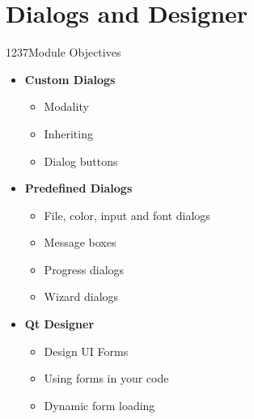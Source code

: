 %
%
%
%

\section{Dialogs and Designer}

\begin{slide}{1237}{Module Objectives}
  \label{widgets}
  
  \begin{itemize}
  \item \textbf{Custom Dialogs}
    \begin{itemize}
    \item Modality
    \item Inheriting 
    \item Dialog buttons
  \end{itemize}
  \item \textbf{Predefined Dialogs}
    \begin{itemize}
    \item File, color, input and font dialogs
    \item Message boxes
    \item Progress dialogs
    \item Wizard dialogs
   \end{itemize}
 \item \textbf{Qt Designer}
    \begin{itemize}
    \item Design UI Forms
    \item Using forms in your code
    \item Dynamic form loading
  \end{itemize}
  \end{itemize}
  
\end{slide}




